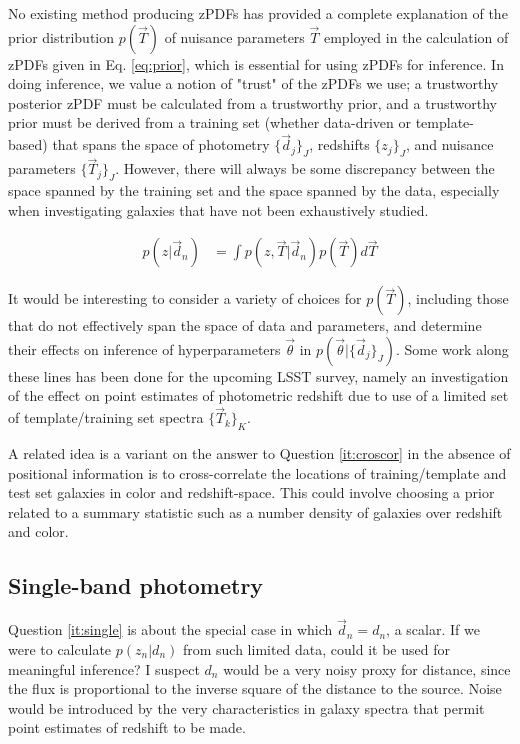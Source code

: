\documentclass[12pt, onecolumn]{emulateapj}
\begin{document}
No existing method producing zPDFs has provided a complete explanation of the prior distribution $p(\vec{T})$ of nuisance parameters $\vec{T}$ employed in the calculation of zPDFs given in Eq. \ref{eq:prior}, which is essential for using zPDFs for inference.  In doing inference, we value a notion of "trust" of the zPDFs we use; a trustworthy posterior zPDF must be calculated from a trustworthy prior, and a trustworthy prior must be derived from a training set (whether data-driven or template-based) that spans the space of photometry $\{\vec{d}_{j}\}_{J}$, redshifts $\{z_{j}\}_{J}$, and nuisance parameters $\{\vec{T}_{j}\}_{J}$.  However, there will always be some discrepancy between the space spanned by the training set and the space spanned by the data, especially when investigating galaxies that have not been exhaustively studied.   

\begin{align}
\label{eq:prior}
p(z|\vec{d}_{n}) &= \int p(z,\vec{T}|\vec{d}_{n})p(\vec{T})d\vec{T}
\end{align}

It would be interesting to consider a variety of choices for $p(\vec{T})$, including those that do not effectively span the space of data and parameters, and determine their effects on inference of hyperparameters $\vec{\theta}$ in $p(\vec{\theta}|\{\vec{d}_{j}\}_{J})$.  Some work along these lines has been done for the upcoming LSST survey, namely an investigation of the effect on point estimates of photometric redshift due to use of a limited set of template/training set spectra $\{\vec{T}_{k}\}_{K}$.  \citep{abe09}

A related idea is a variant on the answer to Question \ref{it:croscor} in the absence of positional information is to cross-correlate the locations of training/template and test set galaxies in color and redshift-space.  This could involve choosing a prior related to a summary statistic such as a number density of galaxies over redshift and color.

\subsection{Single-band photometry}

Question \ref{it:single} is about the special case in which $\vec{d}_{n}=d_{n}$, a scalar.  If we were to calculate $p(z_{n}|d_{n})$ from such limited data, could it be used for meaningful inference?  I suspect $d_{n}$ would be a very noisy proxy for distance, since the flux is proportional to the inverse square of the distance to the source.  Noise would be introduced by the very characteristics in galaxy spectra that permit point estimates of redshift to be made.
\end{document}
